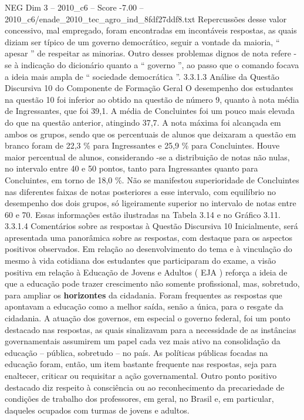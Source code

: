 \begin{textsample}{NEG Dim 3 – 2010\_c6 – Score -7.00 – 2010\_c6/enade\_2010\_tec\_agro\_ind\_8fdf27ddf8.txt}
Repercussões desse valor concessivo, mal empregado, foram encontradas em incontáveis respostas, as quais diziam ser típico de um governo democrático, seguir a vontade da maioria, “ apesar ” de respeitar as minorias.
Outro desses problemas dignos de nota refere -se à indicação do dicionário quanto a “ governo ”, ao passo que o comando focava a ideia mais ampla de “ sociedade democrática ”. 3.3.1.3 Análise da Questão Discursiva 10 do Componente de Formação Geral O desempenho dos estudantes na questão 10 foi inferior ao obtido na questão de número 9, quanto à nota média de Ingressantes, que foi 39,1.
A média de Concluintes foi um pouco mais elevada do que na questão anterior, atingindo 37,7.
A nota máxima foi alcançada em ambos os grupos, sendo que os percentuais de alunos que deixaram a questão em branco foram de 22,3 \% para Ingressantes e 25,9 \% para Concluintes.
Houve maior percentual de alunos, considerando -se a distribuição de notas não nulas, no intervalo entre 40 e 50 pontos, tanto para Ingressantes quanto para Concluintes, em torno de 18,0 \%.
Não se manifestou superioridade de Concluintes nas diferentes faixas de notas posteriores a esse intervalo, com equilíbrio no desempenho dos dois grupos, só ligeiramente superior no intervalo de notas entre 60 e 70.
Essas informações estão ilustradas na Tabela 3.14 e no Gráfico 3.11. 3.3.1.4 Comentários sobre as respostas à Questão Discursiva 10 Inicialmente, será apresentada uma panorâmica sobre as respostas, com destaque para os aspectos positivos observados.
Em relação ao desenvolvimento do tema e à vinculação do mesmo à vida cotidiana dos estudantes que participaram do exame, a visão positiva em relação à Educação de Jovens e Adultos ( EJA ) reforça a ideia de que a educação pode trazer crescimento não somente profissional, mas, sobretudo, para ampliar os \textbf{horizontes} da cidadania.
Foram frequentes as respostas que apontavam a educação como a melhor saída, senão a única, para o resgate da cidadania.
A atuação dos governos, em especial o governo federal, foi um ponto destacado nas respostas, as quais sinalizavam para a necessidade de as instâncias governamentais assumirem um papel cada vez mais ativo na consolidação da educação – pública, sobretudo – no país.
As políticas públicas focadas na educação foram, então, um item bastante frequente nas respostas, seja para enaltecer, criticar ou requisitar a ação governamental.
Outro ponto positivo destacado diz respeito à consciência ou ao reconhecimento da precariedade de condições de trabalho dos professores, em geral, no Brasil e, em particular, daqueles ocupados com turmas de jovens e adultos.

\end{textsample}
